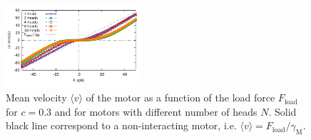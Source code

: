 \documentclass[aps,pre,twocolumn,showpacs,showkeys,superscriptaddress,floatfix]{revtex4-1}
\begin{document}
\begin{figure}[t]
\centering
\includegraphics[width=0.45\textwidth,height=!]{F_v_heads}
\caption{
\label{fig:F_v_heads} 
Mean velocity $\langle v \rangle$ of the motor as a function of the load force $F_\text{load}$ for $c=0.3$ and for motors with different number of heads $N$.
Solid black line correspond to a non-interacting motor, i.e. $\langle v \rangle = F_\text{load} / \gamma_\text{M}$. 
}
\end{figure}
\end{document}
